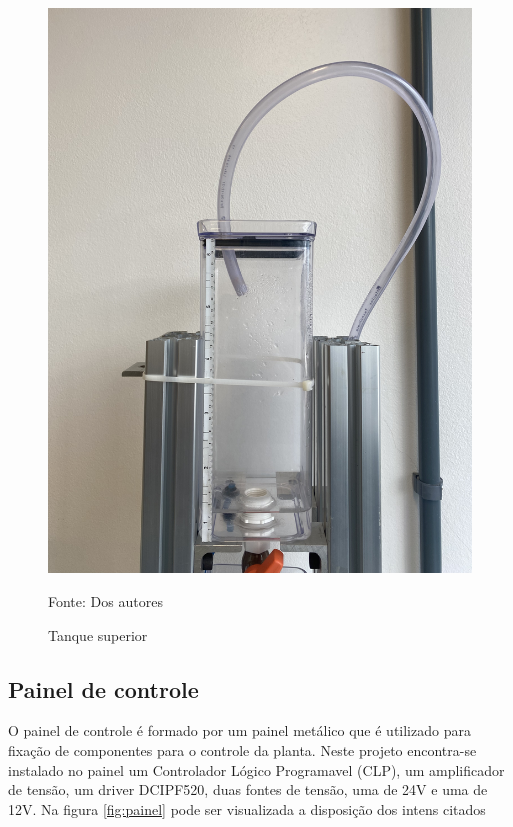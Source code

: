 \begin{figure}[H]
        \centering\footnotesize
        \caption{Tanque superior}
        \begin{center}
            \includegraphics[scale=0.1]{imagens/tanque_superior.jpg}
        \end{center}
        \label{fig:tanque_sup}
        \par Fonte: Dos autores
    \end{figure}
    
\subsection{Painel de controle}
\hspace{11mm}O painel de controle é formado por um painel metálico que é utilizado para fixação de componentes para o controle da planta. Neste projeto encontra-se instalado no painel um Controlador Lógico Programavel (CLP), um amplificador de tensão, um driver DCIPF520, duas fontes de tensão, uma de 24V e uma de 12V. Na figura \ref{fig:painel} pode ser visualizada a disposição dos intens citados


